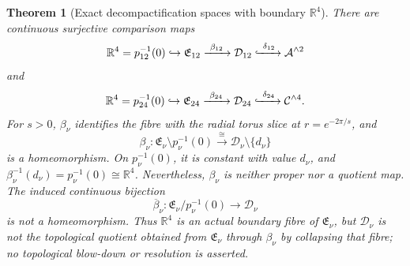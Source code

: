 \documentclass[11pt,letterpaper]{article}
\numberwithin{equation}{section}
\newtheorem{theorem}{Theorem}[section]
\theoremstyle{definition}
\theoremstyle{remark}
\newcommand{\R}{\mathbb R}
\begin{document}
\begin{theorem}[Exact decompactification spaces with boundary \(\R^4\)]
There are continuous surjective comparison maps
\[
 \R^4=p_{12}^{-1}(0)\hookrightarrow\mathfrak E_{12}
 \xrightarrow{\ \beta_{12}\ }\mathcal D_{12}
 \xhookrightarrow{\ \delta_{12}\ }\mathcal A^{\wedge2}
\]
and
\[
 \R^4=p_{24}^{-1}(0)\hookrightarrow\mathfrak E_{24}
 \xrightarrow{\ \beta_{24}\ }\mathcal D_{24}
 \xhookrightarrow{\ \delta_{24}\ }\mathcal C^{\wedge4}.
\]
For \(s>0\), \(\beta_\nu\) identifies the fibre with the radial torus
slice at \(r=e^{-2\pi/s}\), and
\begin{equation}
 \beta_\nu:
 \mathfrak E_\nu\setminus p_\nu^{-1}(0)
 \xrightarrow{\ \cong\ }
 \mathcal D_\nu\setminus\{d_\nu\}
 \label{eq:beta-positive-homeomorphism}
\end{equation}
is a homeomorphism.  On \(p_\nu^{-1}(0)\), it is constant with value
\(d_\nu\), and
\(\beta_\nu^{-1}(d_\nu)=p_\nu^{-1}(0)\cong\R^4\).
Nevertheless, \(\beta_\nu\) is neither proper nor a quotient map.  The
induced continuous bijection
\begin{equation}
 \overline\beta_\nu:
 \mathfrak E_\nu/p_\nu^{-1}(0)\longrightarrow\mathcal D_\nu
 \label{eq:beta-induced-bijection}
\end{equation}
is not a homeomorphism.  Thus \(\R^4\) is an actual boundary fibre of
\(\mathfrak E_\nu\), but \(\mathcal D_\nu\) is not the topological quotient
obtained from \(\mathfrak E_\nu\) through \(\beta_\nu\) by collapsing that
fibre; no topological blow-down or resolution is asserted.
\end{theorem}
\end{document}
